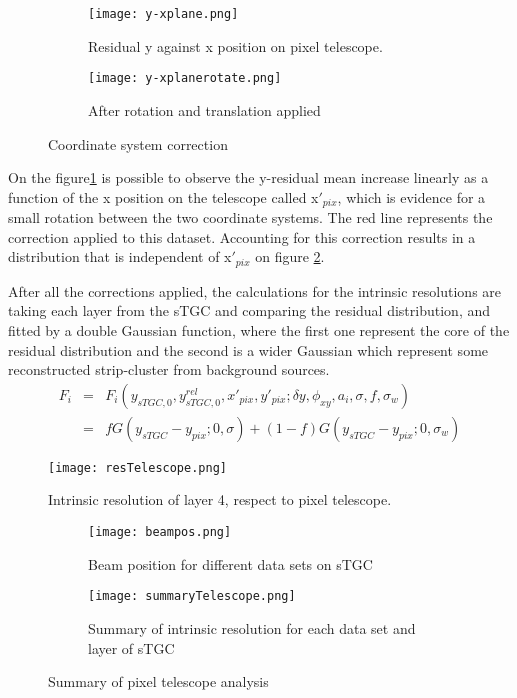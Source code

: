 	\begin{figure}[ht]
		\centering
		\hspace*{\fill}
		\begin{subfigure}[b]{0.42\textwidth}
			\centering
			\texttt{[image: y-xplane.png]}
			\caption{Residual y against x position on pixel telescope.}\label{xyplanefit}
		\end{subfigure}
		\hfill
		\begin{subfigure}[b]{0.42\textwidth}
			\centering
			\texttt{[image: y-xplanerotate.png]}
			\caption{After rotation and translation applied}\label{xrotate}
		\end{subfigure}
		\hspace*{\fill}
		\caption{Coordinate system correction}\label{rotation}
	\end{figure}
	On the figure\ref{xyplanefit} is possible to observe the y-residual mean increase linearly as a function of the x
	position on the telescope called x$'_{pix}$, which is evidence for a small rotation between the two coordinate systems. 
	The red line represents the correction applied to this dataset. Accounting for this correction results in a distribution
	that is independent of x$'_{pix}$ on figure \ref{xrotate}.\par
	After all the corrections applied, the calculations for the intrinsic resolutions are taking each layer from the sTGC
	and comparing the residual distribution, and fitted by a double Gaussian function, where the first one represent the core
	of the residual distribution and the second is a wider Gaussian which represent some reconstructed strip-cluster from
	background sources.
	\begin{eqnarray*}
	F_i &=& F_i(y_{sTGC,0}, y_{sTGC,0}^{rel}, x'_{pix},y'_{pix};\delta y,\phi_{xy},a_i,\sigma,f,\sigma_w)\\
			&=& f G(y_{sTGC}-y_{pix};0,\sigma) + (1-f)G(y_{sTGC}-y_{pix};0,\sigma_w)
	\end{eqnarray*}
	\begin{figure}[ht]
	\centering
	\texttt{[image: resTelescope.png]}
	\caption{Intrinsic resolution of layer 4, respect to pixel telescope.}\label{restelescope}
	\end{figure}

	\begin{figure}[ht]
	\centering
		\hspace*{\fill}
	\begin{subfigure}[b]{0.3\textwidth}
	\texttt{[image: beampos.png]}
	\caption{Beam position for different data sets on sTGC}\label{beampos}
	\end{subfigure}
	\hfill
	\begin{subfigure}[b]{0.6\textwidth}
	\centering
	\texttt{[image: summaryTelescope.png]}
	\caption{Summary of intrinsic resolution for each data set and layer of sTGC}\label{}
	\end{subfigure}
	\hspace*{\fill}
	\caption{Summary of pixel telescope analysis}\label{summary}
	\end{figure}


